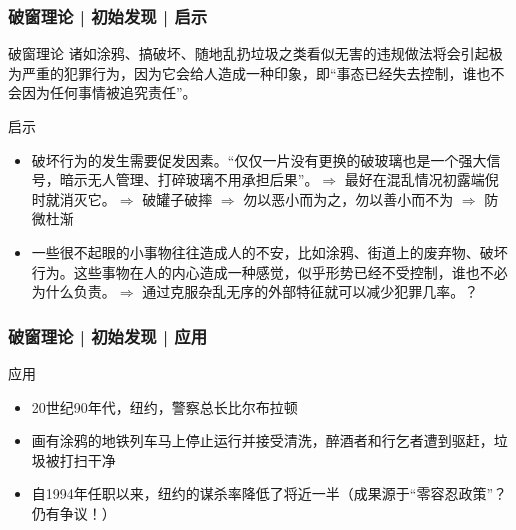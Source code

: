 \begin{frame}
  \frametitle{破窗理论 | 初始发现 | \alert{启示}}
  \begin{block}{破窗理论}
诸如涂鸦、搞破坏、随地乱扔垃圾之类看似无害的违规做法将会引起极为严重的犯罪行为，因为它会给人造成一种印象，即“事态已经失去控制，谁也不会因为任何事情被追究责任”。
  \end{block}
  \pause
  \begin{block}{启示}
    \begin{itemize}
    \item 破坏行为的发生需要促发因素。“仅仅一片没有更换的破玻璃也是一个强大信号，暗示无人管理、打碎玻璃不用承担后果”。$\Longrightarrow$ 最好在混乱情况初露端倪时就消灭它。$\Longrightarrow$ 破罐子破摔 $\Longrightarrow$ 勿以恶小而为之，勿以善小而不为 $\Longrightarrow$ 防微杜渐
      \item 一些很不起眼的小事物往往造成人的不安，比如涂鸦、街道上的废弃物、破坏行为。这些事物在人的内心造成一种感觉，似乎形势已经不受控制，谁也不必为什么负责。$\Longrightarrow$ 通过克服杂乱无序的外部特征就可以减少犯罪几率。？
    \end{itemize}
  \end{block}
\end{frame}

\begin{frame}
  \frametitle{破窗理论 | 初始发现 | 应用}
  \begin{block}{应用}
    \begin{itemize}
      \item 20世纪90年代，纽约，警察总长比尔\textbullet 布拉顿
      \item 画有涂鸦的地铁列车马上停止运行并接受清洗，醉酒者和行乞者遭到驱赶，垃圾被打扫干净
      \item 自1994年任职以来，纽约的谋杀率降低了将近一半（成果源于“零容忍政策”？仍有争议！）
    \end{itemize}
  \end{block}
\end{frame}

